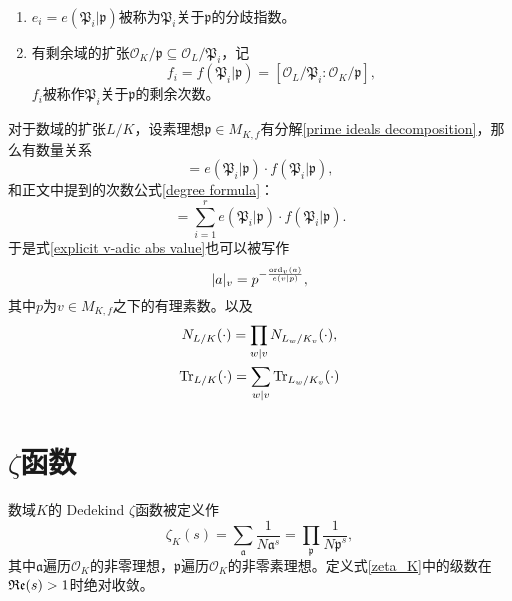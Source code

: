 \begin{definition}\ 
\begin{enumerate}
\item $e_i = e(\mathfrak{P}_i|\mathfrak{p})$被称为$\mathfrak{P}_i$关于$\mathfrak{p}$的分歧指数。
\item 有剩余域的扩张$\mathcal{O}_K/\mathfrak{p} \subseteq \mathcal{O}_L/\mathfrak{P}_i$，记
\begin{equation}
f_i = f(\mathfrak{P}_i|\mathfrak{p}) = [\mathcal{O}_L/\mathfrak{P}_i: \mathcal{O}_K/\mathfrak{p}],
\end{equation}
$f_i$被称作$\mathfrak{P}_i$关于$\mathfrak{p}$的剩余次数。
\end{enumerate}
\end{definition}

对于数域的扩张$L/K$，设素理想$\mathfrak{p}\in M_{K,f}$有分解\eqref{prime ideals decomposition}，那么有数量关系
\begin{equation}
[L_{\mathfrak{P}_i} : K_{\mathfrak{p}}] = e(\mathfrak{P}_i|\mathfrak{p})\cdot f(\mathfrak{P}_i|\mathfrak{p}),
\end{equation}
和正文中提到的次数公式\eqref{degree formula}：
\begin{equation}
[L: K] = \sum\limits_{i=1}^r e(\mathfrak{P}_i|\mathfrak{p}) \cdot f(\mathfrak{P}_i|\mathfrak{p}).
\end {equation}
于是式\eqref{explicit v-adic abs value}也可以被写作
\begin{equation}
|a|_v = p^{-\frac{\operatorname{ord}_v(a)}{e(v|p)}},
\end{equation}
其中$p$为$v\in M_{K,f}$之下的有理素数。以及
\begin{gather}
N_{L/K}(\cdot) = \prod\limits_{w|v} N_{L_w/K_v}(\cdot), \\
\operatorname{Tr}_{L/K}(\cdot) = \sum\limits_{w|v} \operatorname{Tr}_{L_w/K_v}(\cdot)
\end{gather}

\section{$\zeta$函数}
\label{apdx: zeta function}
\begin{definition}
数域$K$的 Dedekind $\zeta$函数被定义作
\begin{equation} \label{zeta_K}
\zeta_K(s) = \sum\limits_{\mathfrak{a}} \dfrac{1}{N\mathfrak{a}^s} = \prod\limits_{\mathfrak{p}} \dfrac{1}{N\mathfrak{p}^s},
\end{equation}
其中$\mathfrak{a}$遍历$\mathcal{O}_K$的非零理想，$\mathfrak{p}$遍历$\mathcal{O}_K$的非零素理想。定义式\eqref{zeta_K}中的级数在$\operatorname{\mathfrak{Re}}(s) > 1$时绝对收敛。
\end{definition}

